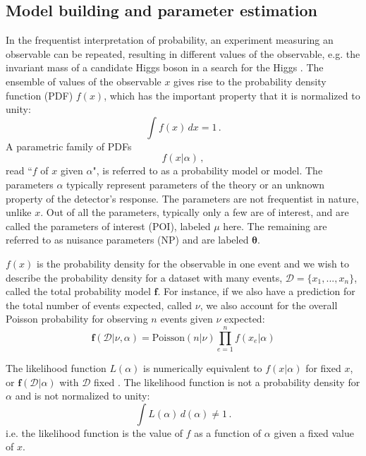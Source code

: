 \subsection{Model building and parameter estimation}
In the frequentist interpretation of probability, an experiment measuring an observable can be repeated, resulting in different values of the observable, e.g. the invariant mass of a candidate Higgs boson in a search for the Higgs \cite{2011-Statistics-Cranmer}. The ensemble of values of the observable $x$ gives rise to the probability density function (PDF) $f(x)$, which has the important property that it is normalized to unity:
\begin{equation*}
    \int f(x) \, dx = 1 \,.
\end{equation*}
A parametric family of PDFs
\begin{equation*}
    f(x|\alpha) \, ,
\end{equation*}
read ``$f$ of $x$ given $\alpha$", is referred to as a probability model or model. The parameters $\alpha$ typically represent parameters of the theory or an unknown property of the detector's response. The parameters are not frequentist in nature, unlike $x$. Out of all the parameters, typically only a few are of interest, and are called the parameters of interest (POI), labeled $\mu$ here. The remaining are referred to as nuisance parameters (NP) \cite{2011-Statistics-Cranmer} and are labeled $\boldsymbol{\theta}$.

$f(x)$ is the probability density for the observable in one event and we wish to describe the probability density for a dataset with many events, $\mathcal{D} = \{x_1, ..., x_n\}$, called the total probability model $\boldsymbol{f}$. For instance, if we also have a prediction for the total number of events expected, called $\nu$, we also account for the overall Poisson probability for observing $n$ events given $\nu$ expected:
\begin{equation}
    \boldsymbol{f}(\mathcal{D}|\nu, \alpha) = \text{Poisson}(n|\nu) \prod_{e=1}^{n} f(x_e | \alpha)
\end{equation}

The likelihood function $L(\alpha)$ is numerically equivalent to $f(x|\alpha)$ for fixed $x$, or $\boldsymbol{f}(\mathcal{D}|\alpha)$ with $\mathcal{D}$ fixed \cite{2011-Statistics-Cranmer}. The likelihood function is not a probability density for $\alpha$ and is not normalized to unity:
\begin{equation*}
    \int L(\alpha) \, d(\alpha) \neq 1 \, .
\end{equation*}
i.e. the likelihood function is the value of $f$ as a function of $\alpha$ given a fixed value of $x$.

